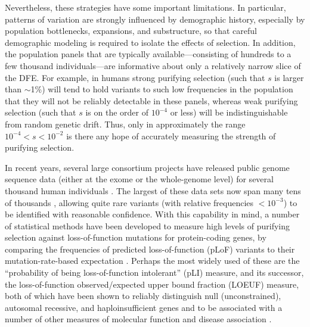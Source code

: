 \documentclass[11pt]{article}
\begin{document}
Nevertheless, these strategies have some important limitations.  In particular, patterns of variation are strongly influenced by demographic history, especially by population bottlenecks, expansions, and substructure, so that careful demographic modeling is required to isolate the effects of selection.  In addition, the population panels that are typically available---consisting of hundreds to a few thousand individuals---are informative about only a relatively narrow slice of the DFE.  For example, in humans strong purifying selection (such that $s$ is larger than $\sim$1\%) will tend to hold variants to such low frequencies in the population that they will not be reliably detectable in these panels, whereas weak purifying selection (such that $s$ is on the order of $10^{-4}$ or less) will be indistinguishable from random genetic drift.  Thus, only in approximately the range $10^{-4} < s < 10^{-2}$  is there any hope of accurately measuring the strength of purifying selection.

In recent years, several large consortium projects have released public genome sequence data (either at the exome or the whole-genome level) for several thousand human individuals \cite{FUETAL13,1KGCONS15,LEKETAL16,KARCETAL20}.  The largest of these data sets now span many tens of thousands \cite{LEKETAL16,KARCETAL20}, allowing quite rare variants (with relative frequencies  $<10^{-3}$) to be identified with reasonable confidence.  With this capability in mind, a number of statistical methods have been developed to measure high levels of purifying selection against loss-of-function mutations for protein-coding genes, by comparing the frequencies of predicted loss-of-function (pLoF) variants to their mutation-rate-based expectation \cite{PETRETAL13,SAMOETAL14,LEKETAL16,KARCETAL20,CASSETAL17,HAVRETAL19}.
Perhaps the most widely used of these are the ``probability of being loss-of-function intolerant'' (pLI) measure, and its successor, the loss-of-function observed/expected upper bound fraction (LOEUF) measure, both of which have been shown to reliably distinguish null (unconstrained), autosomal recessive, and haploinsufficient genes and to be associated with a number of other measures of molecular function and disease association \cite{LEKETAL16,KARCETAL20}.
\end{document}
